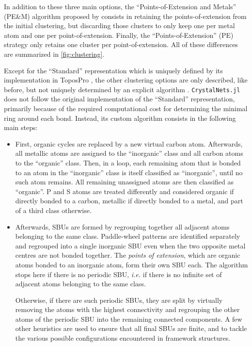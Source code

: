 \documentclass[main.tex]{subfiles}
\begin{document}
In addition to these three main options, the ``Points-of-Extension and Metals'' (PE\&M) algorithm proposed by \textcite{ProserpioPEM} consists in retaining the points-of-extension from the initial clustering, but discarding those clusters to only keep one per metal atom and one per point-of-extension. Finally, the ``Points-of-Extension'' (PE) strategy only retains one cluster per point-of-extension. All of these differences are summarized in \cref{fig:clustering}.


Except for the ``Standard'' representation which is uniquely defined by its implementation in ToposPro \autocite{BlatovSimplify,BlatovCSD}, the other clustering options are only described, like before, but not uniquely determined by an explicit algorithm \autocite{IUPAC_SBU,OKeeffeSBU,OKeeffe,BlatovSimplify,MetalOxo,ProserpioPEM}. \texttt{CrystalNets.jl} does not follow the original implementation of the ``Standard'' representation\autocite{BlatovCSD}, primarily because of the required computational cost for determining the minimal ring around each bond. Instead, its custom algorithm consists in the following main steps:
\begin{itemize}
	\item First, organic cycles are replaced by a new virtual carbon atom. Afterwards, all metallic atoms are assigned to the ``inorganic'' class and all carbon atoms to the ``organic'' class. Then, in a loop, each remaining atom that is bonded to an atom in the ``inorganic'' class is itself classified as ``inorganic'', until no such atom remains. All remaining unassigned atoms are then classified as ``organic''. P and S atoms are treated differently and considered organic if directly bonded to a carbon, metallic if directly bonded to a metal, and part of a third class otherwise.
	
	\item Afterwards, SBUs are formed by regrouping together all adjacent atoms belonging to the same class. Paddle-wheel patterns are identified separately and regrouped into a single inorganic SBU even when the two opposite metal centres are not bonded together. The \textit{points of extension}, which are organic atoms bonded to an inorganic atom, form their own SBU each. The algorithm stops here if there is no periodic SBU, \textit{i.e.} if there is no infinite set of adjacent atoms belonging to the same class.
	
	Otherwise, if there are such periodic SBUs, they are split by virtually removing the atoms with the highest connectivity and regrouping the other atoms of the periodic SBU into the remaining connected components. A few other heuristics are used to ensure that all final SBUs are finite, and to tackle the various possible configurations encountered in framework structures.
\end{itemize}
\end{document}
